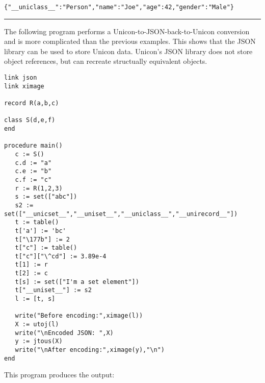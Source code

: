 \documentclass[letterpaper,12pt]{article}
\begin{document}
\begin{verbatim}
{"__uniclass__":"Person","name":"Joe","age":42,"gender":"Male"}
\end{verbatim}

\bigskip
\hrule\vspace{0.1cm}
\bigskip
\noindent
The following program performs a Unicon-to-JSON-back-to-Unicon conversion and
is more complicated than the previous examples. This shows that the JSON
library can be used to store Unicon data. Unicon's JSON library does not
store object references, but can recreate structually equivalent objects.

\begin{verbatim}
link json
link ximage

record R(a,b,c)

class S(d,e,f)
end

procedure main()
   c := S()
   c.d := "a"
   c.e := "b"
   c.f := "c"
   r := R(1,2,3)
   s := set(["abc"])
   s2 := set(["__unicset__","__uniset__","__uniclass__","__unirecord__"])
   t := table()
   t['a'] := 'bc'
   t["\177b"] := 2
   t["c"] := table()
   t["c"]["\^cd"] := 3.89e-4
   t[1] := r
   t[2] := c
   t[s] := set(["I'm a set element"])
   t["__uniset__"] := s2
   l := [t, s]

   write("Before encoding:",ximage(l))
   X := utoj(l)
   write("\nEncoded JSON: ",X)
   y := jtous(X)
   write("\nAfter encoding:",ximage(y),"\n")
end

\end{verbatim}

\vspace{0.1cm}
\noindent
This program produces the output:
\end{document}
